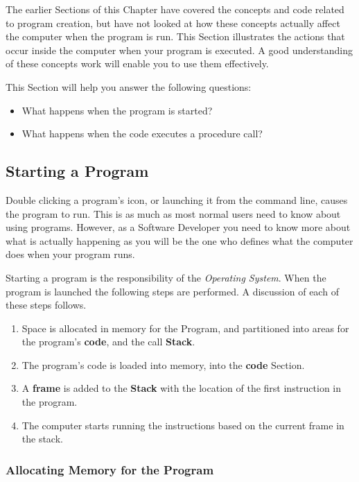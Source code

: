The earlier Sections of this Chapter have covered the concepts and code related to program creation, but have not looked at how these concepts actually affect the computer when the program is run. This Section illustrates the actions that occur inside the computer when your program is executed. A good understanding of these concepts work will enable you to use them effectively.

This Section will help you answer the following questions:
\begin{itemize}
  \item What happens when the program is started?
  \item What happens when the code executes a procedure call?
\end{itemize}

\subsection{Starting a Program} %
\label{sub:starting_a_program}

Double clicking a program's icon, or launching it from the command line, causes the program to run. This is as much as most normal users need to know about using programs. However, as a Software Developer you need to know more about what is actually happening as you will be the one who defines what the computer does when your program runs.

\bigskip

Starting a program is the responsibility of the \emph{Operating System}. When the program is launched the following steps are performed. A discussion of each of these steps follows.

\begin{enumerate}
  \item Space is allocated in memory for the Program, and partitioned into areas for the program's \textbf{code}, and the call \textbf{Stack}.
  \item The program's code is loaded into memory, into the \textbf{code} Section.
  \item A \textbf{frame} is added to the \textbf{Stack} with the location of the first instruction in the program.
  \item The computer starts running the instructions based on the current frame in the stack.
\end{enumerate}

\clearpage
\subsubsection{Allocating Memory for the Program} %
\label{ssub:allocating_memory_for_the_program}

